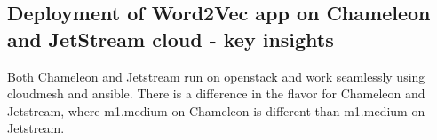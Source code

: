 \subsection{Deployment of Word2Vec app on Chameleon and JetStream cloud - key
insights}
Both Chameleon and Jetstream run on openstack and work seamlessly using
cloudmesh and ansible. There is a difference in the flavor for Chameleon and Jetstream,
where m1.medium on Chameleon is different than m1.medium on Jetstream.